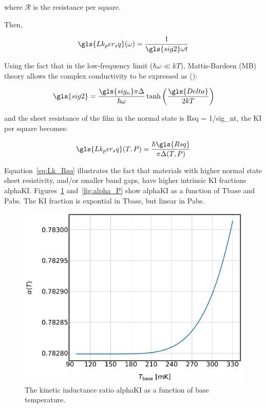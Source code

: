 where $\mathcal{R}$ is the resistance per square.

Then,

\begin{equation}
  \gls{Lk_per_sq}(\omega) = \frac{1}{\gls{sig2}\omega t}
\end{equation}

Using the fact that in the low-frequency limit ($\hbar\omega \ll kT$), Mattis-Bardeen (MB) theory allows the complex conductivity to be expressed as (\citet{mauskopf2018transition,annunziata2010tunable}):

\begin{equation}
  \gls{sig2} = \frac{\gls{sig_n}\pi\Delta}{\hbar\omega}\tanh \left(\frac{\gls{Delta}}{2kT}\right)
\end{equation}

and the sheet resistance of the film in the normal state is \gls{Rsq} = 1/\gls{sig_n}t, the KI per square becomes:

\begin{equation} \label{eq:Lk_Rsq}
  \gls{Lk_per_sq}(T,P) = \frac{\hbar\gls{Rsq}}{\pi\Delta(T,P)}
\end{equation}

Equation~\ref{eq:Lk_Rsq} illustrates the fact that materials with higher normal state sheet resistivity, and/or smaller band gaps, have higher intrinsic KI fractions \gls{alphaKI}. Figures~\ref{fig:alpha_T} and~\ref{fig:alpha_P} show \gls{alphaKI} as a function of \gls{Tbase} and \gls{Pabs}. The KI fraction is expontial in \gls{Tbase}, but linear in \gls{Pabs}.

\begin{figure}[!htbp]
\centering
\includegraphics[width=\textwidth]{figures/kid_model/alpha_T}
\caption[ as a function of base temperature.]{The kinetic inductance ratio \gls{alphaKI} as a function of base temperature.}
\label{fig:alpha_T}
\end{figure}

